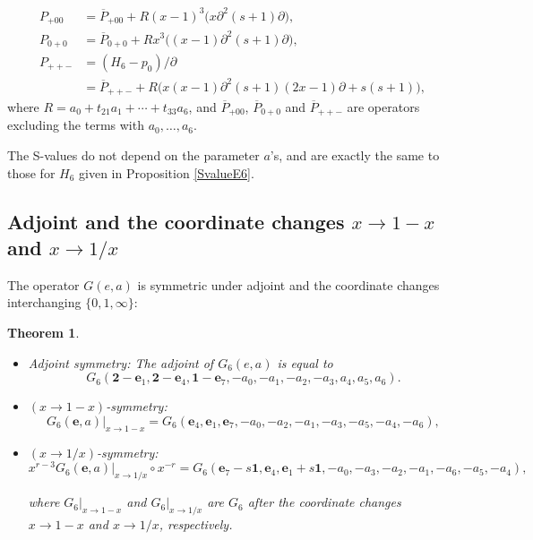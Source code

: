 \documentclass[a4paper,12pt]{article}
\newtheorem{thm}{Theorem}[section]  %
\theoremstyle{definition}
\theoremstyle{remark}
\numberwithin{equation}{section} %
\begin{document}
\[\begin{array}{ll}
   P_{+00}&=\overline{P}_{+00}+R(x-1)^3\bigl(x\partial^2(s+1)\partial\bigr),\\[1mm]
   P_{0+0}&=\overline{P}_{0+0}+Rx^3\bigl((x-1)\partial^2(s+1)\partial\bigr),\\[1mm]
   P_{++-}&=(H_6-p_0)/\partial\\[1mm]
   &=\overline{P}_{++-}+R\bigl(x(x-1)\partial^2(s+1)(2x-1)\partial+s(s+1)\bigr),\end{array}\]
where $R=a_0+t_{21}a_1+\cdots+t_{33}a_6$,
and $\overline{P}_{+00}$, $\overline{P}_{0+0}$ and $\overline{P}_{++-}$ 
are operators excluding the terms with $a_0, \dots, a_6$. 

The S-values do not depend on the parameter $a$'s, and are exactly the same to those for $H_6$ given in Proposition \ref{SvalueE6}.
\subsection{Adjoint and the coordinate changes $x\to1-x$ and $x\to1/x$}
The operator $G(e,a)$ is symmetric under adjoint and the coordinate changes interchanging $\{0,1,\infty\}$:
\begin{thm}\label{symmetriesG6}\noindent
  \begin{itemize}[leftmargin=*] \setlength{\itemsep}{2pt}
\item Adjoint symmetry: The adjoint of $G_6(e,a)$ is equal to
   $$G_6({\bm 2}-{\bm e}_1,{\bm 2}-{\bm e}_4,{\bm 1}-{\bm e}_7,%
  -a_0,-a_1,-a_2,-a_3,a_4,a_5,a_6).$$
\item $(x\to1-x)$-symmetry: $$G_6({\bm e},a)|_{x\to1-x}=G_6({\bm e}_4,{\bm e}_1,{\bm e}_7,-a_0,-a_2,-a_1,-a_3,-a_5,-a_4,-a_6),$$

\item $(x\to1/x)$-symmetry: $$x^{r-3}G_6({\bm e},a)|_{x\to1/x}\circ x^{-r}=G_6({\bm e}_7-s{\bm1},{\bm e}_4,{\bm e}_1+s{\bm1},-a_0,-a_3,-a_2,-a_1,-a_6,-a_5,-a_4),$$

  where $G_6|_{x\to1-x}$ and $G_6|_{x\to1/x}$ are $G_6$ after the coordinate changes $x\to1-x$ and $x\to1/x$, respectively.
\end{itemize}
 \end{thm}
\end{document}
